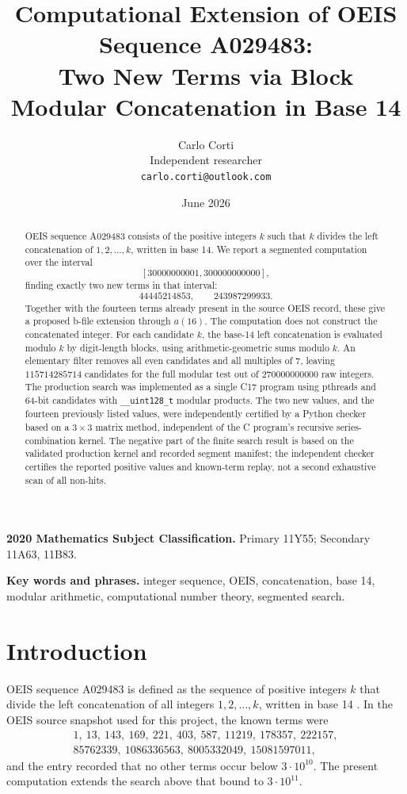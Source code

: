 \documentclass[11pt]{article}
\title{Computational Extension of OEIS Sequence A029483:\\
Two New Terms via Block Modular Concatenation in Base 14}
\author{Carlo Corti\\
Independent researcher\\
\texttt{carlo.corti@outlook.com}}
\date{June 2026}
\theoremstyle{definition}
\theoremstyle{remark}
\begin{document}
\maketitle

\begin{abstract}
OEIS sequence A029483 consists of the positive integers \(k\) such that
\(k\) divides the left concatenation of \(1,2,\ldots,k\), written in base
14.  We report a segmented computation over the interval
\[
  [30000000001,300000000000],
\]
finding exactly two new terms in that interval:
\[
  44445214853,\qquad 243987299933.
\]
Together with the fourteen terms already present in the source OEIS record,
these give a proposed b-file extension through \(a(16)\).  The computation
does not construct the concatenated integer.  For each candidate \(k\), the
base-14 left concatenation is evaluated modulo \(k\) by digit-length blocks,
using arithmetic-geometric sums modulo \(k\).  An elementary filter removes
all even candidates and all multiples of \(7\), leaving
\(115714285714\) candidates for the full modular test out of
\(270000000000\) raw integers.  The production search was implemented as a
single C17 program using pthreads and 64-bit candidates with
\texttt{\_\_uint128\_t} modular products.  The two new values, and the
fourteen previously listed values, were independently certified by a Python
checker based on a \(3\times 3\) matrix method, independent of the C
program's recursive series-combination kernel.  The negative part of the
finite search result is based on the validated production kernel and recorded
segment manifest; the independent checker certifies the reported positive
values and known-term replay, not a second exhaustive scan of all non-hits.
\end{abstract}

\noindent\textbf{2020 Mathematics Subject Classification.}
Primary 11Y55; Secondary 11A63, 11B83.

\noindent\textbf{Key words and phrases.}
integer sequence, OEIS, concatenation, base 14, modular arithmetic,
computational number theory, segmented search.

\section{Introduction}

OEIS sequence A029483 is defined as the sequence of positive integers \(k\)
that divide the left concatenation of all integers \(1,2,\ldots,k\), written
in base 14 \cite{oeisA029483}.  In the OEIS source snapshot used for this
project, the known terms were
\[
\begin{gathered}
1,\ 13,\ 143,\ 169,\ 221,\ 403,\ 587,\ 11219,\ 178357,\ 222157,\\
85762339,\ 1086336563,\ 8005332049,\ 15081597011,
\end{gathered}
\]
and the entry recorded that no other terms occur below \(3\cdot 10^{10}\).
The present computation extends the search above that bound to
\(3\cdot 10^{11}\).
\end{document}
